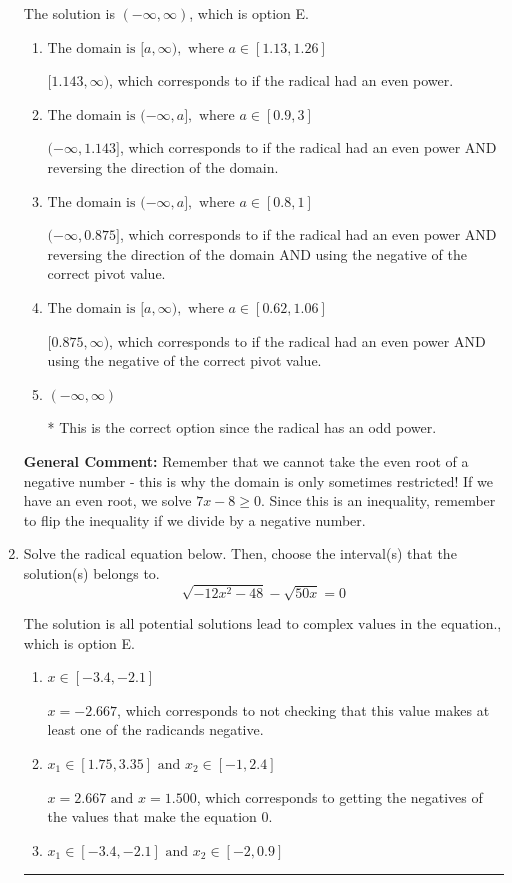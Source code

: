 \documentclass{extbook}[14pt]
\newcommand{\litem}[1]{\item #1

\rule{\textwidth}{0.4pt}}
\begin{document}
\begin{enumerate}
{The solution is \( (-\infty, \infty) \), which is option E.\begin{enumerate}[label=\Alph*.]
\item \( \text{The domain is } [a, \infty), \text{   where } a \in [1.13, 1.26] \)

$[1.143, \infty)$, which corresponds to if the radical had an even power.
\item \( \text{The domain is } (-\infty, a], \text{   where } a \in [0.9, 3] \)

$(-\infty, 1.143]$, which corresponds to if the radical had an even power AND reversing the direction of the domain.
\item \( \text{The domain is } (-\infty, a], \text{   where } a \in [0.8, 1] \)

$(-\infty, 0.875]$, which corresponds to if the radical had an even power AND reversing the direction of the domain AND using the negative of the correct pivot value.
\item \( \text{The domain is } [a, \infty), \text{   where } a \in [0.62, 1.06] \)

$[0.875, \infty)$, which corresponds to if the radical had an even power AND using the negative of the correct pivot value.
\item \( (-\infty, \infty) \)

* This is the correct option since the radical has an odd power.
\end{enumerate}

\textbf{General Comment:} Remember that we cannot take the even root of a negative number - this is why the domain is only sometimes restricted! If we have an even root, we solve $7 x - 8 \geq 0$. Since this is an inequality, remember to flip the inequality if we divide by a negative number.
}
\litem{
Solve the radical equation below. Then, choose the interval(s) that the solution(s) belongs to.
\[ \sqrt{-12 x^2 - 48} - \sqrt{50 x} = 0 \]

The solution is \( \text{all potential solutions lead to complex values in the equation.} \), which is option E.\begin{enumerate}[label=\Alph*.]
\item \( x \in [-3.4,-2.1] \)

$x = -2.667$, which corresponds to not checking that this value makes at least one of the radicands negative.
\item \( x_1 \in [1.75, 3.35] \text{ and } x_2 \in [-1,2.4] \)

$x = 2.667 \text{ and } x = 1.500$, which corresponds to getting the negatives of the values that make the equation 0.
\item \( x_1 \in [-3.4, -2.1] \text{ and } x_2 \in [-2,0.9] \)


\end{enumerate}}
\end{enumerate}
\end{document}
